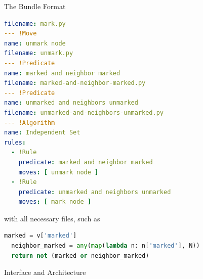 \documentclass{beamer}
\begin{document}
\begin{frame}[fragile,t]
\begin{columns}[t]
\begin{column}{.45\textwidth}
\begin{block}{The Bundle Format}
\begin{lstlisting}[language=yaml,basicstyle=\ttfamily\YAMLkeystyle]
filename: mark.py
--- !Move
name: unmark node
filename: unmark.py
--- !Predicate
name: marked and neighbor marked
filename: marked-and-neighbor-marked.py
--- !Predicate
name: unmarked and neighbors unmarked
filename: unmarked-and-neighbors-unmarked.py
--- !Algorithm
name: Independent Set
rules:
  - !Rule
    predicate: marked and neighbor marked
    moves: [ unmark node ]
  - !Rule
    predicate: unmarked and neighbors unmarked
    moves: [ mark node ]
\end{lstlisting}
          with all necessary files, such as 
\vspace{.3in}
\begin{lstlisting}[language=Python,stringstyle=\color{green!50!black},keywordstyle=\color{blue}]
  marked = v['marked']
  neighbor_marked = any(map(lambda n: n['marked'], N))
  return not (marked or neighbor_marked)
\end{lstlisting}
      \end{block}

      \begin{block}{Interface and Architecture}
        \vspace*{-.1ex}

        \setlength\fboxsep{0pt}
        \setlength\fboxrule{.1ex}
        \hfill

        \vspace*{-.1ex}


\end{block}
\end{column}
\end{columns}
\end{frame}
\end{document}
